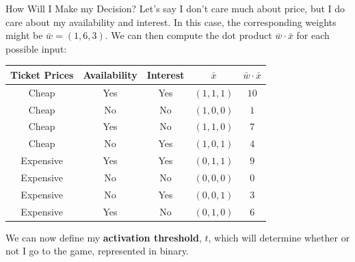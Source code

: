 \documentclass[xcolor=dvipsnames, fontsize=11pt, %
pagesize, %
parskip=half-, t]{beamer}
\begin{document}
\begin{frame}{How Will I Make my Decision?}
Let's say I don't care much about price, but I do care about my availability and interest. In this case, the corresponding weights might be $\bar{w}=(1, 6, 3)$. \pause We can then compute the dot product $\bar{w}\cdot \bar{x}$ for each possible input:  
\begin{table} 
\center 
\begin{tabular}{cccc|c}
Ticket Prices & Availability & Interest & $\bar{x}$ & $\bar{w}\cdot \bar{x}$ \\ \hline 
Cheap & Yes & Yes & $(1,1,1)$ & $10$ \\
Cheap & No & No & $(1,0,0)$ & $1$ \\
Cheap & Yes & No & $(1,1,0)$ & $7$\\
Cheap & No & Yes & $(1,0,1)$ & $4$   \\
Expensive & Yes & Yes & $(0,1,1)$ & $9$ \\
Expensive & No & No & $(0,0,0)$  & $0$ \\
Expensive & No & Yes & $(0,0,1)$ & $3$\\
Expensive & Yes & No & $(0,1,0)$ & $6$
\end{tabular}
\end{table} \pause
\vspace{0.05\textheight}
We can now define my \textbf{activation threshold}, $t$, which will determine whether or not I go to the game, represented in binary.
\end{frame}
\end{document}
